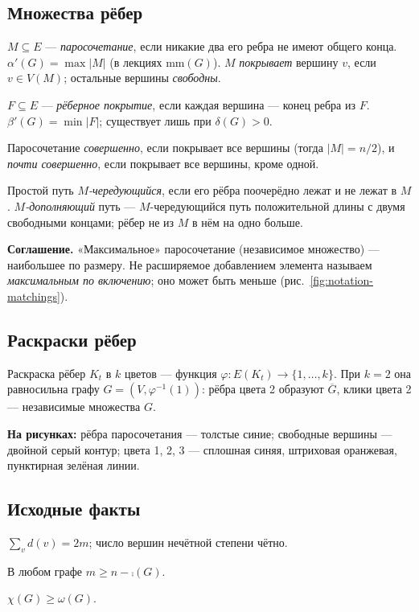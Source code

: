 \subsection*{Множества рёбер}
\begin{definition}[Паросочетание]
\(M\subseteq E\) — \emph{паросочетание}, если никакие два его ребра не имеют общего конца.
\(\alpha'(G)=\max|M|\) (в лекциях \(\mathrm{mm}(G)\)).
\(M\) \emph{покрывает} вершину \(v\), если \(v\in V(M)\); остальные вершины \emph{свободны}.
\end{definition}
\begin{definition}
\(F\subseteq E\) — \emph{рёберное покрытие}, если каждая вершина — конец ребра из \(F\).
\(\beta'(G)=\min|F|\); существует лишь при \(\delta(G)>0\).
\end{definition}
\begin{definition}
Паросочетание \emph{совершенно}, если покрывает все вершины (тогда \(|M|=n/2\)),
и \emph{почти совершенно}, если покрывает все вершины, кроме одной.
\end{definition}
\begin{definition}
Простой путь \emph{\(M\)-чередующийся}, если его рёбра поочерёдно лежат и не лежат в \(M\).
\emph{\(M\)-дополняющий} путь — \(M\)-чередующийся путь положительной длины с двумя
свободными концами; рёбер не из \(M\) в нём на одно больше.
\end{definition}
\begin{tcolorbox}[colback=cbOrangeBack,colframe=cbOrange!45!cbGray,
  borderline west={1.6pt}{0pt}{cbOrange}]
\textbf{Соглашение.} «Максимальное» паросочетание (независимое множество) — наибольшее
по размеру. Не расширяемое добавлением элемента называем \emph{максимальным по
включению}; оно может быть меньше (рис.~\ref{fig:notation-matchings}).
\end{tcolorbox}


\subsection*{Раскраски рёбер}
\begin{definition}
Раскраска рёбер \(K_t\) в \(k\) цветов — функция \(\varphi\colon E(K_t)\to\{1,\ldots,k\}\).
При \(k=2\) она равносильна графу \(G=(V,\varphi^{-1}(1))\): рёбра цвета 2 образуют
\(\overline G\), клики цвета 2 — независимые множества \(G\).
\end{definition}
\textbf{На рисунках:} рёбра паросочетания — толстые синие; свободные вершины — двойной
серый контур; цвета 1, 2, 3 — сплошная синяя, штриховая оранжевая, пунктирная зелёная линии.

\subsection*{Исходные факты}
\begin{lemma}[О рукопожатиях]
\(\sum_{v}d(v)=2m\); число вершин нечётной степени чётно.
\end{lemma}
\begin{lemma}
В любом графе \(m\ge n-\comp(G)\).
\end{lemma}
\begin{lemma}
\(\chi(G)\ge\omega(G)\).
\end{lemma}
